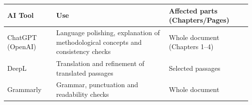 
\begin{table}[H]
\centering
\begin{tabular}{|p{3cm}|p{6cm}|p{5cm}|}
\hline
\textbf{AI Tool} & \textbf{Use} & \textbf{Affected parts (Chapters/Pages)} \\ \hline
ChatGPT (OpenAI) & Language polishing, explanation of methodological concepts and consistency checks & Whole document (Chapters 1--4) \\ \hline
DeepL & Translation and refinement of translated passages & Selected passages \\ \hline
Grammarly & Grammar, punctuation and readability checks & Whole document \\ \hline
\end{tabular}
\end{table}
